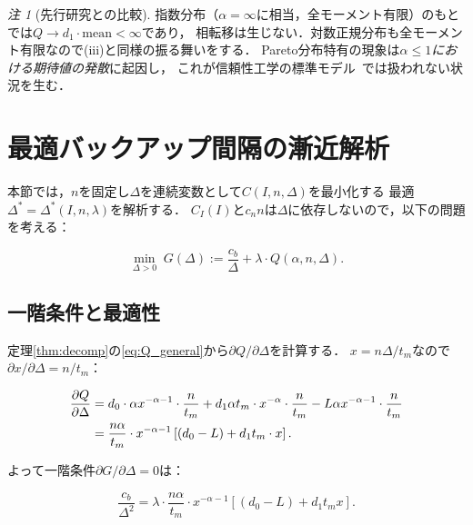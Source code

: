 \documentclass[12pt,a4paper]{article}
\theoremstyle{plain}
\theoremstyle{definition}
\theoremstyle{remark}
\newtheorem{remark}[theorem]{注}
\newcommand{\Dopt}{\Delta^*}
\begin{document}
\begin{remark}[先行研究との比較]
指数分布（$\alpha=\infty$に相当，全モーメント有限）のもとでは$Q\to d_1\cdot\text{mean}<\infty$であり，
相転移は生じない．対数正規分布も全モーメント有限なので(iii)と同様の振る舞いをする．
Pareto分布特有の現象は\emph{$\alpha\le1$における期待値の発散}に起因し，
これが信頼性工学の標準モデル~\cite{barlow1965,nakagawa2005}では扱われない状況を生む．
\end{remark}

\section{最適バックアップ間隔の漸近解析}
\label{sec:delta}

本節では，$n$を固定し$\Delta$を連続変数として$C(I,n,\Delta)$を最小化する
最適$\Dopt=\Dopt(I,n,\lambda)$を解析する．
$C_I(I)$と$c_n n$は$\Delta$に依存しないので，以下の問題を考える：

\begin{equation}\label{eq:opt_delta}
  \min_{\Delta>0}\; G(\Delta):=\frac{c_b}{\Delta}+\lambda\cdot Q(\alpha,n,\Delta).
\end{equation}

\subsection{一階条件と最適性}

定理\ref{thm:decomp}の\eqref{eq:Q_general}から$\partial Q/\partial\Delta$を計算する．
$x=n\Delta/t_m$なので$\partial x/\partial\Delta=n/t_m$：

\begin{align}
  \frac{\partial Q}{\partial\Delta}
  &= d_0\cdot\alpha x^{-\alpha-1}\cdot\frac{n}{t_m}
  + d_1\alpha t_m\cdot x^{-\alpha}\cdot\frac{n}{t_m}
  - L\alpha x^{-\alpha-1}\cdot\frac{n}{t_m}\notag\\
  &= \frac{n\alpha}{t_m}\cdot x^{-\alpha-1}\left[(d_0-L)+d_1 t_m\cdot x\right]. \label{eq:dQdDelta}
\end{align}

よって一階条件$\partial G/\partial\Delta=0$は：

\begin{equation}\label{eq:foc}
  \frac{c_b}{\Delta^2}
  = \lambda\cdot\frac{n\alpha}{t_m}\cdot x^{-\alpha-1}\left[(d_0-L)+d_1 t_m x\right].
\end{equation}
\end{document}
